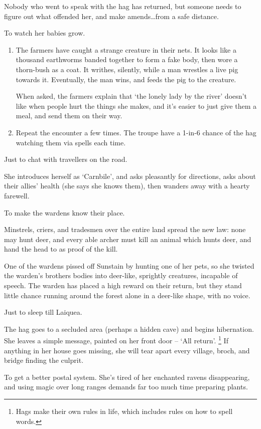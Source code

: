 \begin{multicols}{2}
\begin{dlist}
  Nobody who went to speak with the hag has returned, but someone needs to figure out what offended her, and make amends\ldots from a safe distance.
  \item
  To watch her babies grow.
  \begin{enumerate}
    \item
    The farmers have caught a strange creature in their nets.
    It looks like a thousand earthworms banded together to form a fake body, then wore a thorn-bush as a coat.
    It writhes, silently, while a man wrestles a live pig towards it.
    Eventually, the man wins, and feeds the pig to the creature.

    When asked, the farmers explain that `the lonely lady by the river' doesn't like when people hurt the things she makes, and it's easier to just give them a meal, and send them on their way.
    \item
    Repeat the encounter a few times.
    The troupe have a 1-in-6 chance of the hag watching them via spells each time.
  \end{enumerate}
  \item
  Just to chat with travellers on the road.

  She introduces herself as `Carnbile', and asks pleasantly for directions, asks about their allies' health (she says she knows them), then wanders away with a hearty farewell.
  \item
  To make the \glspl{warden} know their place.

  Minstrels, criers, and tradesmen over the entire land spread the new law: none may hunt deer, and every able archer must kill an animal which hunts deer, and hand the head to  as proof of the kill.

  One of the \glspl{warden} pissed off Sunstain by hunting one of her pets, so she twisted the \gls{warden}'s brothers bodies into deer-like, sprightly creatures, incapable of speech.
  The \gls{warden} has placed a high reward on their return, but they stand little chance running around the forest alone in a deer-like shape, with no voice.
  \item
  Just to sleep till \gls{Laiquea}.

  The hag goes to a secluded area (perhaps a hidden cave) and begins hibernation.
  She leaves a simple message, painted on her front door -- `{All return}'.%
  \footnote{Hags make their own rules in life, which includes rules on how to spell words.}
  If anything in her house goes missing, she will tear apart every \gls{village}, \gls{broch}, and bridge finding the culprit.
  \item
  To get a better postal system.
  She's tired of her enchanted ravens disappearing, and using magic over long ranges demands far too much time preparing plants.


\end{dlist}
\end{multicols}
